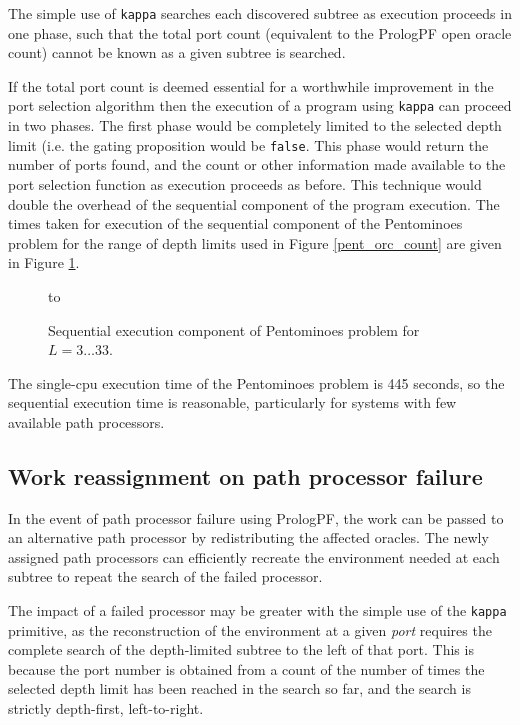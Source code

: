 The simple use of \texttt{kappa} searches each discovered subtree as execution proceeds
in one phase, such that the total port count (equivalent to the PrologPF open oracle
count) cannot be known as a given subtree is searched.

If the total port count is deemed essential for a worthwhile improvement in the
port selection algorithm then the execution of a program using \texttt{kappa} can
proceed in two phases.  The first phase would be completely limited to the
selected depth limit (i.e. the gating proposition would be \texttt{false}.  This
phase would return the number of ports found, and the count or other information made
available to the port selection function as execution proceeds as before.  This
technique would double the overhead of the sequential component of the program
execution.  The times taken for execution of the sequential component of the
Pentominoes problem for the range of depth limits used in Figure \ref{pent_orc_count}
are given in Figure \ref{pent_bf_times}.

\begin{figure}[htbp]
\vspace{5mm} \hbox to 
\caption{Sequential execution component of Pentominoes problem for $L=3\ldots 33$.}
\vspace{5mm}
\label{pent_bf_times}
\end{figure}

The single-cpu execution time of the Pentominoes problem is 445 seconds, so the
sequential execution time is reasonable, particularly for systems with few available
path processors.

\subsection{Work reassignment on path processor failure}

In the event of path processor failure using PrologPF,
the work can be passed to an alternative
path processor by redistributing the affected oracles.  The newly assigned path
processors can efficiently recreate the environment needed at each subtree to
repeat the search of the failed processor.

The impact of a failed processor may be greater with the simple use of the
\texttt{kappa} primitive, as the reconstruction of the environment at a given
\textit{port} requires the complete search of the depth-limited subtree to
the left of that port.  This is because the port number is obtained from a
count of the number of times the selected depth limit has been reached in
the search so far, and the search is strictly depth-first, left-to-right.


